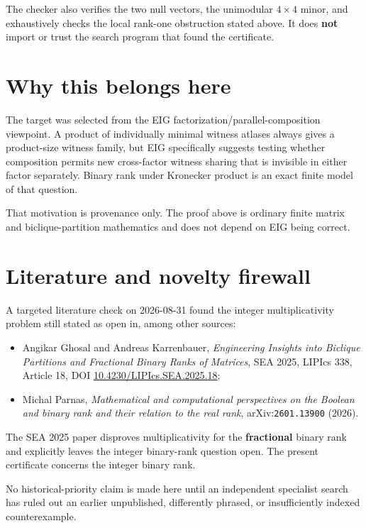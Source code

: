 \documentclass[11pt]{article}
\begin{document}
The checker also verifies the two null vectors, the unimodular $4\times4$ minor, and exhaustively checks the local rank-one obstruction stated above. It does \textbf{not} import or trust the search program that found the certificate.

\section*{Why this belongs here}

The target was selected from the EIG factorization/parallel-composition viewpoint. A product of individually minimal witness atlases always gives a product-size witness family, but EIG specifically suggests testing whether composition permits new cross-factor witness sharing that is invisible in either factor separately. Binary rank under Kronecker product is an exact finite model of that question.

That motivation is provenance only. The proof above is ordinary finite matrix and biclique-partition mathematics and does not depend on EIG being correct.

\section*{Literature and novelty firewall}

A targeted literature check on 2026-08-31 found the integer multiplicativity problem still stated as open in, among other sources:
\begin{itemize}
  \item Angikar Ghosal and Andreas Karrenbauer, \emph{Engineering Insights into Biclique Partitions and Fractional Binary Ranks of Matrices}, SEA 2025, LIPIcs 338, Article 18, DOI \href{https://doi.org/10.4230/LIPIcs.SEA.2025.18}{10.4230/LIPIcs.SEA.2025.18};
  \item Michal Parnas, \emph{Mathematical and computational perspectives on the Boolean and binary rank and their relation to the real rank}, arXiv:\texttt{2601.13900} (2026).
\end{itemize}

The SEA 2025 paper disproves multiplicativity for the \textbf{fractional} binary rank and explicitly leaves the integer binary-rank question open. The present certificate concerns the integer binary rank.

No historical-priority claim is made here until an independent specialist search has ruled out an earlier unpublished, differently phrased, or insufficiently indexed counterexample.
\end{document}
